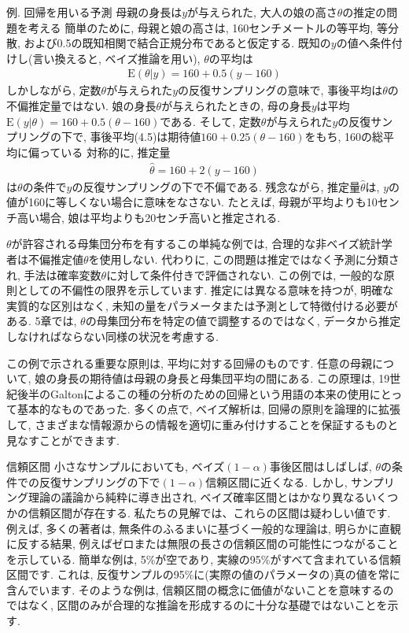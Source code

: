\documentclass[10pt,dvipdfmx,a4]{beamer}
\newcommand{\eq}[1]{\begin{align}#1\end{align}}
\newcommand{\eqn}[1]{\begin{align*}#1\end{align*}}
\begin{document}

\begin{frame}{例. 回帰を用いる予測}
母親の身長は$y$が与えられた, 大人の娘の高さ$\theta$の推定の問題を考える
簡単のために, 母親と娘の高さは, 160センチメートルの等平均, 等分散, および0.5の既知相関で結合正規分布であると仮定する.
既知の$y$の値へ条件付けし(言い換えると, ベイズ推論を用い), $\theta$の平均は
\eq{\text{E}(\theta|y)=160+0.5(y-160)}
しかしながら, 定数$\theta$が与えられた$y$の反復サンプリングの意味で, 事後平均は$\theta$の不偏推定量ではない.
娘の身長$\theta$が与えられたときの, 母の身長$y$は平均$\text{E}(y|\theta)=160+0.5(\theta-160)$である.
そして, 定数$\theta$が与えられた$y$の反復サンプリングの下で, 事後平均(4.5)は期待値$160+0.25(\theta-160)$をもち, 160の総平均に偏っている
対称的に, 推定量
\eqn{\hat{\theta}=160+2(y-160)}
は$\theta$の条件で$y$の反復サンプリングの下で不偏である.
残念ながら, 推定量$\hat{\theta}$は, $y$の値が160に等しくない場合に意味をなさない.
たとえば, 母親が平均よりも10センチ高い場合, 娘は平均よりも20センチ高いと推定される.
\end{frame}


\begin{frame}
$\theta$が許容される母集団分布を有するこの単純な例では, 合理的な非ベイズ統計学者は不偏推定値$\theta$を使用しない.
代わりに, この問題は推定ではなく予測に分類され, 手法は確率変数$\theta$に対して条件付きで評価されない.
この例では, 一般的な原則としての不偏性の限界を示しています.
推定には異なる意味を持つが, 明確な実質的な区別はなく, 未知の量をパラメータまたは予測として特徴付ける必要がある.
5章では, $\theta$の母集団分布を特定の値で調整するのではなく, データから推定しなければならない同様の状況を考慮する.

この例で示される重要な原則は, 平均に対する回帰のものです.
任意の母親について, 娘の身長の期待値は母親の身長と母集団平均の間にある.
この原理は, 19世紀後半のGaltonによるこの種の分析のための回帰という用語の本来の使用にとって基本的なものであった.
多くの点で, ベイズ解析は, 回帰の原則を論理的に拡張して, さまざまな情報源からの情報を適切に重み付けすることを保証するものと見なすことができます.
\end{frame}


\begin{frame}{信頼区間}
小さなサンプルにおいても, ベイズ$(1-\alpha)$事後区間はしばしば, $\theta$の条件での反復サンプリングの下で$(1-\alpha)$信頼区間に近くなる.
しかし, サンプリング理論の議論から純粋に導き出され, ベイズ確率区間とはかなり異なるいくつかの信頼区間が存在する.
私たちの見解では、これらの区間は疑わしい値です.
例えば, 多くの著者は, 無条件のふるまいに基づく一般的な理論は, 明らかに直観に反する結果, 例えばゼロまたは無限の長さの信頼区間の可能性につながることを示している.
簡単な例は, 5\%が空であり, 実線の95\%がすべて含まれている信頼区間です.
これは, 反復サンプルの95\%に(実際の値のパラメータの)真の値を常に含んでいます.
そのような例は, 信頼区間の概念に価値がないことを意味するのではなく, 区間のみが合理的な推論を形成するのに十分な基礎ではないことを示す.
\end{frame}
\end{document}
